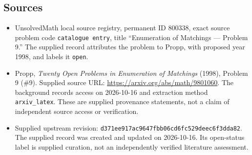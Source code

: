 \documentclass[11pt]{article}
\begin{document}
\subsection{Sources}
\begin{itemize}
\item UnsolvedMath local source registry, permanent ID \(800338\), exact source problem code \texttt{catalogue entry}, title ``Enumeration of Matchings --- Problem 9.'' The supplied record attributes the problem to Propp, with proposed year 1998, and labels it \texttt{open}.
\item Propp, \emph{Twenty Open Problems in Enumeration of Matchings} (1998), Problem 9 (\#9). Supplied source URL: \url{https://arxiv.org/abs/math/9801060}. The background records access on 2026-10-16 and extraction method \texttt{arxiv\_latex}. These are supplied provenance statements, not a claim of independent source access or verification.
\item Supplied upstream revision: \texttt{d371ee917ac9647fbb06cd6fc529deec6f3dda82}. The supplied record was created and updated on 2026-10-16. Its open-status label is supplied curation, not an independently verified literature assessment.
\end{itemize}
\end{document}
